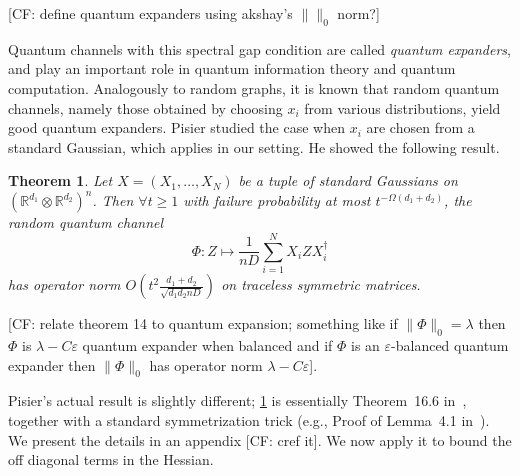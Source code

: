 \documentclass{article}
\newtheorem{theorem}{Theorem}
\newtheorem{corollary}[theorem]{Corollary}
\newcommand{\R}{{\mathbb{R}}}
\newcommand{\ot}{\otimes}
\newcommand\eps{\varepsilon}
\newcommand\Sym{\mathcal{S}}
\newcommand\tr{\operatorname{Tr}}
\newcommand{\CF}[1]{{\color{purple}[CF: #1]}}
\begin{document}
\CF{define quantum expanders using akshay's $\|\|_0$ norm?}

Quantum channels with this spectral gap condition are called \emph{quantum expanders}, and play an important role in quantum information theory and quantum computation. Analogously to random graphs, it is known that random quantum channels, namely those obtained by choosing $x_i$ from various distributions, yield good quantum expanders. Pisier studied the case when $x_i$ are chosen from a standard Gaussian, which applies in our setting. He showed the following result. 


\begin{theorem}\label{thm:hess-pisier} Let $X = (X_1, \dots, X_N)$ be a tuple of standard Gaussians on $(\R^{d_1}\ot \R^{d_2})^n$. Then $\forall t \geq 1$ with failure probability at most $t^{-\Omega(d_{1} + d_{2})}$, the random quantum channel 
$$\Phi: Z \mapsto \frac{1}{nD}\sum_{i = 1}^N X_i Z X_i^\dagger$$
has operator norm 
$O \left( t^{2} \frac{d_{1}+d_{2}}{\sqrt{d_{1} d_{2} nD}} \right)$ on traceless symmetric matrices. \end{theorem}

\CF{relate theorem 14 to quantum expansion; something like if $\|\Phi\|_0 = \lambda$ then $\Phi$ is $\lambda - C \eps$ quantum expander when balanced and if $\Phi$ is an $\eps$-balanced quantum expander then $\|\Phi\|_0$ has operator norm $\lambda - C \eps$}.

Pisier's actual result is slightly different; \cref{thm:hess-pisier} is essentially Theorem~16.6 in~\cite{pisier2012grothendieck}, together with a standard symmetrization trick (e.g., Proof of Lemma~4.1 in~\cite{P14}). We present the details in an appendix \CF{cref it}. We now apply it to bound the off diagonal terms in the Hessian.

\end{document}
